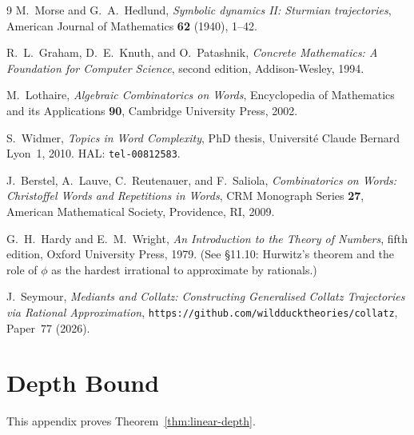 \documentclass[12pt]{article}
\theoremstyle{definition}
\theoremstyle{remark}
\theoremstyle{plain}
\begin{document}
\begin{thebibliography}{9}
  M.~Morse and G.~A.~Hedlund,
  \textit{Symbolic dynamics II: Sturmian trajectories},
  American Journal of Mathematics \textbf{62} (1940), 1--42.

  R.~L.~Graham, D.~E.~Knuth, and O.~Patashnik,
  \textit{Concrete Mathematics: A Foundation for Computer Science},
  second edition, Addison-Wesley, 1994.

  M.~Lothaire,
  \textit{Algebraic Combinatorics on Words},
  Encyclopedia of Mathematics and its Applications \textbf{90},
  Cambridge University Press, 2002.

  S.~Widmer,
  \textit{Topics in Word Complexity},
  PhD thesis, Universit\'e Claude Bernard Lyon~1, 2010.
  HAL: \texttt{tel-00812583}.

  J.~Berstel, A.~Lauve, C.~Reutenauer, and F.~Saliola,
  \textit{Combinatorics on Words: Christoffel Words and Repetitions in Words},
  CRM Monograph Series \textbf{27},
  American Mathematical Society, Providence, RI, 2009.

  G.~H.~Hardy and E.~M.~Wright,
  \textit{An Introduction to the Theory of Numbers},
  fifth edition, Oxford University Press, 1979.
  (See \S11.10: Hurwitz's theorem and the role of $\phi$ as the hardest
  irrational to approximate by rationals.)

  J.~Seymour,
  \textit{Mediants and Collatz: Constructing Generalised Collatz Trajectories
  via Rational Approximation},
  \texttt{https://github.com/wildducktheories/collatz}, Paper~77 (2026).

\end{thebibliography}

\appendix

\section{Depth Bound}
\label{app:depth-bound}

This appendix proves Theorem~\ref{thm:linear-depth}.
\end{document}
